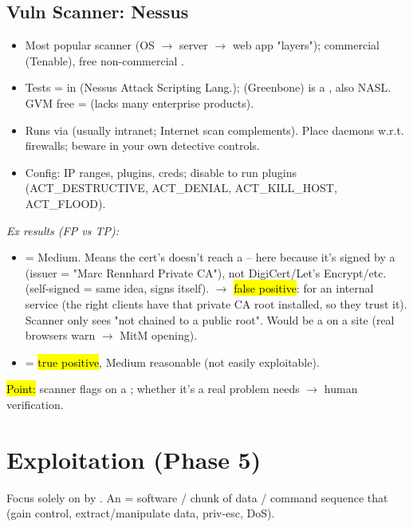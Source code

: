 \subsection{Vuln Scanner: Nessus}
\begin{itemize}
\item Most popular  scanner (OS $\to$ server $\to$ web app "layers"); commercial (Tenable), free non-commercial .
\item Tests =  in  (Nessus Attack Scripting Lang.);  (Greenbone) is a , also NASL. GVM free =  (lacks many enterprise products).
\item Runs via  (usually intranet; Internet scan complements). Place daemons w.r.t. firewalls; beware  in your own detective controls.
\item Config: IP ranges, plugins,  creds; disable  to run  plugins (ACT\_DESTRUCTIVE, ACT\_DENIAL, ACT\_KILL\_HOST, ACT\_FLOOD).
\end{itemize}
\textit{Ex results (FP vs TP):}
\begin{itemize}
\item {} = Medium. Means the cert's  doesn't reach a  -- here because it's signed by a  (issuer = "Marc Rennhard Private CA"), not DigiCert/Let's Encrypt/etc. (self-signed = same idea, signs itself). $\to$ \hl{false positive}:  for an internal service (the right clients have that private CA root installed, so they  trust it). Scanner only sees "not chained to a public root". Would be a  on a  site (real browsers warn $\to$ MitM opening).
\item {} = \hl{true positive}, Medium reasonable (not easily exploitable).
\end{itemize}
\hl{Point:} scanner flags on a ; whether it's a real problem needs  $\to$ human verification.

\section{Exploitation (Phase 5)}
Focus solely on  by . An  = software / chunk of data / command sequence that  (gain control, extract/manipulate data, priv-esc, DoS).

